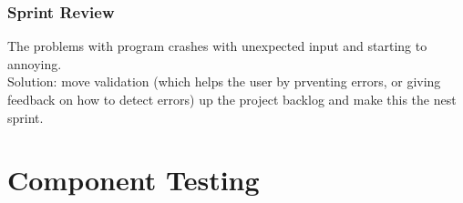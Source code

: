 \documentclass[a4paper,12pt]{article}
\begin{document}
\subsubsection{Sprint Review}
The problems with program crashes with unexpected input and starting to annoying. \\
Solution: move validation (which helps the user by prventing errors, or giving feedback on how to detect errors) up the project backlog and make this the nest sprint.
\section{Component Testing}






	
	
	
	
	
	
	
	
	
	
	
\end{document}
